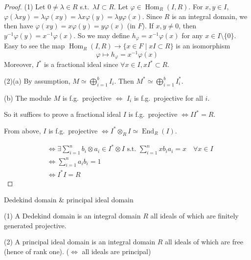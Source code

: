 \documentclass[11pt, a4paper]{report}
\begin{document}
\begin{proof}
(1) Let $0 \neq \lambda \in R$ s.t.\ $\lambda I \subset R$.
Let $\varphi \in \operatorname{Hom}_{R}(I, R)$. For $x, y \in I$, $\varphi(\lambda x y) = \lambda \varphi(x y) = \lambda x \varphi(y) = \lambda y \varphi(x)$.
Since $R$ is an integral domain, we then have $\varphi(x y) = x \varphi(y) = y \varphi(x)$ (in $F$).
If $x, y \neq 0$, then $y^{-1} \varphi(y) = x^{-1} \varphi(x)$.
So we may define $h_{\varphi} = x^{-1} \varphi(x)$ for any $x \in I \setminus \{0\}$.
Easy to see the map $\operatorname{Hom}_{R}(I, R) \rightarrow \{x \in F \mid x I \subset R\}$ is an isomorphism
\[
\varphi \mapsto h_{\varphi} = x^{-1} \varphi(x)
\]
Moreover, $I^{*}$ is a fractional ideal since $\forall x \in I, x I^{*} \subset R$.

(2)(a) By assumption, $M \simeq \bigoplus_{i=1}^{b} I_{i}$. Then $M^{*} \simeq \bigoplus_{i=1}^{b} I_{i}^{*}$.

(b) The module $M$ is f.g.\ projective $\Leftrightarrow$ $I_{i}$ is f.g.\ projective for all $i$.

So it suffices to prove a fractional ideal $I$ is f.g.\ projective $\Leftrightarrow I I^{*}=R$.

From above, $I$ is f.g.\ projective $\Leftrightarrow I^{*} \otimes_{R} I \simeq \operatorname{End}_{R}(I)$.

\[
\begin{aligned}
& \Leftrightarrow \exists \sum_{i=1}^{n} b_{i} \otimes a_{i} \in I^{*} \otimes I \text{ s.t. } \sum_{i=1}^{n} x b_{i} a_{i}=x \quad \forall x \in I \\
& \Leftrightarrow \sum_{i=1}^{n} a_{i} b_{i}=1 \\
& \Leftrightarrow I^{*} I=R
\end{aligned}
\]

\end{proof}

\begin{definition}
Dedekind domain \& principal ideal domain

(1) A Dedekind domain is an integral domain $R$ all ideals of which are finitely generated projective.

(2) A principal ideal domain is an integral domain $R$ all ideals of which are free (hence of rank one). ($\Leftrightarrow$ all ideals are principal)
\end{definition}
\end{document}
